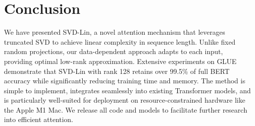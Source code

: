 \section{Conclusion}
We have presented SVD-Lin, a novel attention mechanism that leverages truncated SVD to achieve linear complexity in sequence length. Unlike fixed random projections, our data-dependent approach adapts to each input, providing optimal low-rank approximation. Extensive experiments on GLUE demonstrate that SVD-Lin with rank 128 retains over 99.5\% of full BERT accuracy while significantly reducing training time and memory. The method is simple to implement, integrates seamlessly into existing Transformer models, and is particularly well-suited for deployment on resource-constrained hardware like the Apple M1 Mac. We release all code and models to facilitate further research into efficient attention.